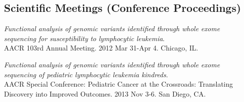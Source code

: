 \documentclass[10pt]{article}
\begin{document}
\subsection*{Scientific Meetings (Conference Proceedings)} 

\item 
{\it Functional analysis of genomic variants identified through whole exome sequencing for susceptibility to lymphocytic leukemia}. \\
AACR 103rd Annual Meeting. 2012 Mar 31-Apr 4. Chicago, IL.
\item
{\it Functional analysis of genomic variants identified through whole exome sequencing of pediatric lymphocytic leukemia kindreds}. \\
AACR Special Conference: Pediatric Cancer at the Crossroads: Translating Discovery into Improved Outcomes. 2013 Nov 3-6. San Diego, CA.
	
\end{document}

